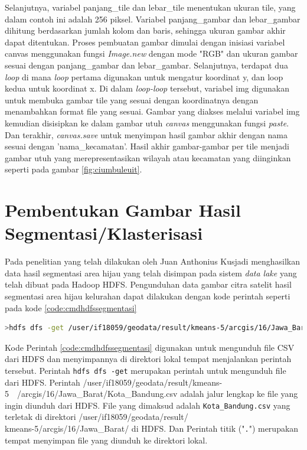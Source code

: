 Selanjutnya, variabel panjang\_tile dan lebar\_tile menentukan ukuran tile, yang dalam contoh ini adalah 256 piksel. Variabel panjang\_gambar dan lebar\_gambar dihitung berdasarkan jumlah kolom dan baris, sehingga ukuran gambar akhir dapat ditentukan. Proses pembuatan gambar  dimulai dengan inisiasi variabel canvas menggunakan fungsi \textit{Image.new }dengan mode "RGB" dan ukuran gambar sesuai dengan panjang\_gambar dan lebar\_gambar. Selanjutnya, terdapat dua \textit{loop} di mana \textit{loop} pertama digunakan untuk mengatur koordinat y, dan loop kedua untuk koordinat x. Di dalam \textit{loop-loop} tersebut, variabel img digunakan untuk membuka gambar tile yang sesuai dengan koordinatnya dengan menambahkan format file yang sesuai. Gambar yang diakses melalui variabel img kemudian disisipkan ke dalam gambar utuh \textit{canvas} menggunakan fungsi \textit{paste}. Dan terakhir, \textit{canvas.save} untuk menyimpan hasil gambar akhir dengan nama sesuai dengan 'nama\_kecamatan'. Hasil akhir gambar-gambar per tile menjadi gambar utuh yang merepresentasikan wilayah atau kecamatan yang diinginkan seperti pada gambar \ref{fig:ciumbuleuit}.

\section{Pembentukan Gambar Hasil Segmentasi/Klasterisasi}
Pada penelitian yang telah dilakukan oleh Juan Anthonius Kusjadi menghasilkan data hasil segmentasi area hijau yang telah disimpan pada sistem \textit{data lake }yang telah dibuat pada Hadoop
HDFS.\cite{juan:22:pengumpulan} Pengunduhan data gambar citra satelit hasil segmentasi area hijau kelurahan dapat dilakukan dengan kode perintah seperti pada kode \ref{code:cmdhdfssegmentasi}

\begin{lstlisting}[language=Bash, caption= Pengembailan Data Hasil Segemntasi,label={code:cmdhdfssegmentasi}]
	>hdfs dfs -get /user/if18059/geodata/result/kmeans-5/arcgis/16/Jawa_Barat/Kota_Bandung.csv .	
\end{lstlisting}

Kode Perintah \ref{code:cmdhdfssegmentasi} digunakan untuk mengunduh file CSV dari HDFS dan menyimpannya di direktori lokal tempat menjalankan perintah tersebut. Perintah \texttt{hdfs dfs -get} merupakan perintah untuk mengunduh file dari HDFS. Perintah /user/if18059/geodata/result/kmeans-5~~/arcgis/16/Jawa\_Barat/Kota\_Bandung.csv adalah jalur lengkap ke file yang ingin diunduh dari HDFS. File yang dimaksud adalah \texttt{Kota\_Bandung.csv} yang terletak di direktori /user/if18059/geodata/result/\\kmeans-5/arcgis/16/Jawa\_Barat/ di HDFS. Dan Perintah titik ("\texttt{.}") merupakan tempat menyimpan file yang diunduh ke direktori lokal.
	

